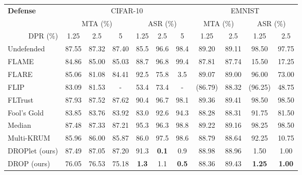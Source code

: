 
\begin{table*}[th]
    \centering
    \begin{tabular}{l|ccc|ccc|cc|cc}
    \toprule
    \multirow{2}{*}{\textbf{Defense}} & \multicolumn{6}{c}{CIFAR-10} & \multicolumn{4}{c}{EMNIST} \\
     & \multicolumn{3}{c}{MTA (\%)} & \multicolumn{3}{c}{ASR (\%)} & \multicolumn{2}{c}{MTA (\%)} & \multicolumn{2}{c}{ASR (\%)} \\
     \cline{2-11}
     \multicolumn{1}{r|}{DPR (\%)} & 1.25 & 2.5 & 5 & 1.25 & 2.5 & 5 & 1.25 & 2.5 & 1.25 & 2.5 \\
    \midrule
    Undefended & 87.55 & 87.32 & 87.40 & 85.5 & 96.6 & 98.4 & 89.20 & 89.11 & 98.50 & 97.75 \\
    \hline
    FLAME & 84.86 & 85.00 & 85.03 & 88.7 & 96.8 & 99.4 & 87.81 & 87.74 & 15.50 & 17.25 \\
    FLARE & 85.06 & 81.08 & 84.41 & 92.5 & 75.8 & 3.5 & 89.07 & 89.00 & 96.00 & 73.00 \\
    FLIP & 83.09 & 81.53 & - & 53.4 & 73.4 & -  & (86.79) & 88.32 & (96.25) & 48.75 \\
    FLTrust & 87.93 & 87.52 & 87.62 & 90.4 & 96.7 & 98.1 & 89.36 & 89.41 & 98.50 & 98.50 \\
    Fool's Gold & 83.85 & 83.76 & 83.92 & 83.0 & 92.6 & 94.3 & 88.28 & 88.31 & 91.75 & 81.50 \\
    Median & 87.48 & 87.33 & 87.21 & 95.3 & 96.3 & 98.8 & 89.22 & 89.16 & 98.25 & 98.50 \\
    Multi-KRUM & 85.96 & 86.00 & 85.87 & 86.0 & 97.5 & 98.6 & 88.79 & 88.64 & 92.25 & 10.75 \\
    \hline
    DROPlet (ours) & 87.49 & 87.05 & 87.20 & 91.3 & \textbf{0.1} & 0.9 & 88.98 & 88.96 & 1.50 & 1.00 \\
    DROP (ours) & 76.05 & 76.53 & 75.18 & \textbf{1.3} & 1.1 & \textbf{0.5} & 88.36 & 89.43 & \textbf{1.25} & \textbf{1.00} \\

\end{tabular}
\end{table*}
